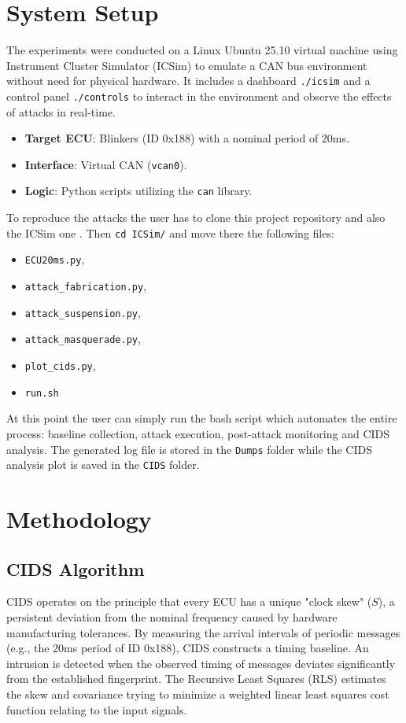 \documentclass[12pt,twocolumn,letterpaper]{article} %
\begin{document}
\section{System Setup}
The experiments were conducted on a Linux Ubuntu 25.10 virtual machine using Instrument Cluster Simulator (ICSim) \cite{icsim} to emulate a CAN bus environment without need for physical hardware. It includes a dashboard \texttt{./icsim} and a control panel \texttt{./controls} to interact in the environment and observe the effects of attacks in real-time.
\begin{itemize}
    \item \textbf{Target ECU}: Blinkers (ID 0x188) with a nominal period of 20ms.
    \item \textbf{Interface}: Virtual CAN (\texttt{vcan0}).
    \item \textbf{Logic}: Python scripts utilizing the \texttt{can} library.
\end{itemize}
To reproduce the attacks the user has to clone this project repository \cite{project} and also the ICSim one \cite{icsim}. Then \texttt{cd ICSim/} and move there the following files:
\begin{itemize}
    \item \texttt{ECU20ms.py},
    \item \texttt{attack\_fabrication.py},
    \item \texttt{attack\_suspension.py},
    \item \texttt{attack\_masquerade.py},
    \item \texttt{plot\_cids.py},
    \item \texttt{run.sh}
\end{itemize}
At this point the user can simply run the bash script which automates the entire process: baseline collection, attack execution, post-attack monitoring and CIDS analysis.
The generated log file is stored in the \texttt{Dumps} folder while the CIDS analysis plot is saved in the \texttt{CIDS} folder.

\section{Methodology}
\subsection{CIDS Algorithm}
CIDS operates on the principle that every ECU has a unique "clock skew" ($S$), a persistent deviation from the nominal frequency caused by hardware manufacturing tolerances. By measuring the arrival intervals of periodic messages (e.g., the 20ms period of ID 0x188), CIDS constructs a timing baseline. An intrusion is detected when the observed timing of messages deviates significantly from the established fingerprint.
The Recursive Least Squares (RLS) estimates the skew and covariance trying to minimize a weighted linear least squares cost function relating to the input signals.
\end{document}
